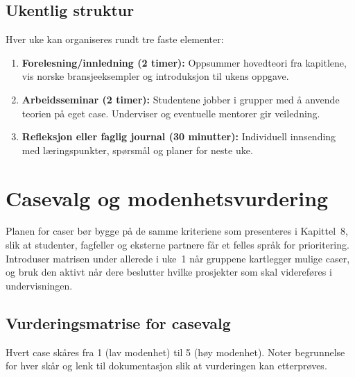 \subsection{Ukentlig struktur}
Hver uke kan organiseres rundt tre faste elementer:
\begin{enumerate}
    \item \textbf{Forelesning/innledning (2 timer):} Oppsummer hovedteori fra kapitlene, vis norske bransjeeksempler og introduksjon til ukens oppgave.
    \item \textbf{Arbeidsseminar (2 timer):} Studentene jobber i grupper med å anvende teorien på eget case. Underviser og eventuelle mentorer gir veiledning.
    \item \textbf{Refleksjon eller faglig journal (30 minutter):} Individuell innsending med læringspunkter, spørsmål og planer for neste uke.
\end{enumerate}

\section{Casevalg og modenhetsvurdering}
Planen for caser bør bygge på de samme kriteriene som presenteres i Kapittel~8, slik at studenter, fagfeller og eksterne partnere får et felles språk for prioritering. Introduser matrisen under allerede i uke~1 når gruppene kartlegger mulige caser, og bruk den aktivt når dere beslutter hvilke prosjekter som skal videreføres i undervisningen.

\subsection*{Vurderingsmatrise for casevalg}
Hvert case skåres fra 1 (lav modenhet) til 5 (høy modenhet). Noter begrunnelse for hver skår og lenk til dokumentasjon slik at vurderingen kan etterprøves.

